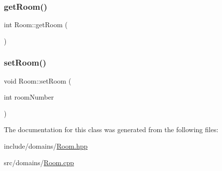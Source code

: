 \subsubsection{\texorpdfstring{getRoom()}{getRoom()}}
{\footnotesize\ttfamily int Room\+::get\+Room (\begin{DoxyParamCaption}{ }\end{DoxyParamCaption})}

\mbox{\label{class_room_ae1645c6cc522f4b1c0ba980736cb440d}} 
\subsubsection{\texorpdfstring{setRoom()}{setRoom()}}
{\footnotesize\ttfamily void Room\+::set\+Room (\begin{DoxyParamCaption}\item[{int}]{room\+Number }\end{DoxyParamCaption})}



The documentation for this class was generated from the following files\+:\begin{DoxyCompactItemize}
\item 
include/domains/\mbox{\hyperlink{_room_8hpp}{Room.\+hpp}}\item 
src/domains/\mbox{\hyperlink{_room_8cpp}{Room.\+cpp}}\end{DoxyCompactItemize}
